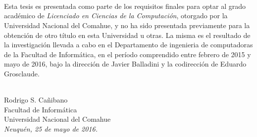 \ \\
\ \\
\label{pagpref}
\\
\ \\
\ \\

\ \\

\ \\
\ \\


Esta tesis es presentada como parte de los requisitos finales para optar al
grado académico de {\em Licenciado en Ciencias de la Computación}, otorgado por
la Universidad Nacional del Comahue, y no ha sido presentada previamente para la
obtención de otro título en esta Universidad u otras. La misma es el resultado
de la investigación llevada a cabo en el Departamento de ingenieria de
computadoras de la Facultad de Informática, en el período comprendido entre
febrero de 2015 y mayo de 2016, bajo la dirección de Javier Balladini y la
codirección de Eduardo Grosclaude.

\vspace{3cm}


\ \\
{\flushright Rodrigo S. Cañibano\\
{\sc Facultad de Informática \\
Universidad Nacional del Comahue}\\
{\em Neuquén, 25 de mayo de 2016.}\\}

\vfill

